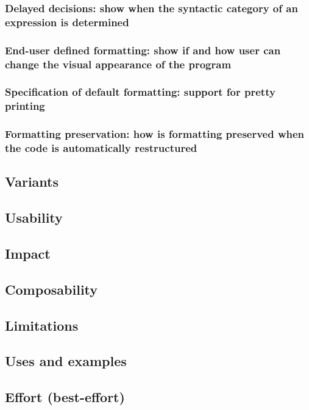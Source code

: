 \documentclass[preprint,numbers,10pt]{sigplanconf}
\begin{document}
\subsubsection{Delayed decisions: show when the syntactic category of an expression is determined}
\subsubsection{End-user defined formatting: show if and how user can change the visual appearance of the program}
\subsubsection{Specification of default formatting: support for pretty printing}
\subsubsection{Formatting preservation: how is formatting preserved when the code is automatically restructured}

\subsection{Variants}

\subsection{Usability}

\subsection{Impact}

\subsection{Composability}

\subsection{Limitations}

\subsection{Uses and examples}

\subsection{Effort (best-effort)}
\end{document}

